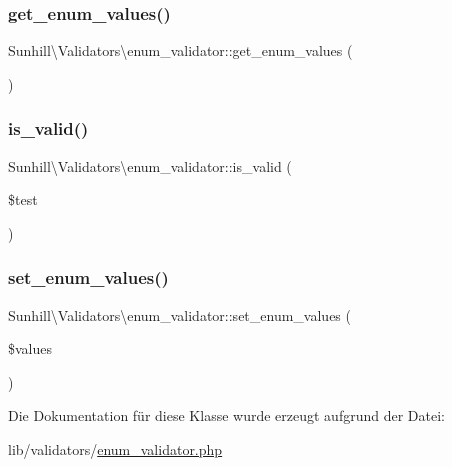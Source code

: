 \subsubsection{\texorpdfstring{get\+\_\+enum\+\_\+values()}{get\_enum\_values()}}
{\footnotesize\ttfamily Sunhill\textbackslash{}\+Validators\textbackslash{}enum\+\_\+validator\+::get\+\_\+enum\+\_\+values (\begin{DoxyParamCaption}{ }\end{DoxyParamCaption})}

\mbox{\label{classSunhill_1_1Validators_1_1enum__validator_ac00328723663a42eea318e463e986aa0}} 
\subsubsection{\texorpdfstring{is\+\_\+valid()}{is\_valid()}}
{\footnotesize\ttfamily Sunhill\textbackslash{}\+Validators\textbackslash{}enum\+\_\+validator\+::is\+\_\+valid (\begin{DoxyParamCaption}\item[{}]{\$test }\end{DoxyParamCaption})\hspace{0.3cm}{\ttfamily [protected]}}

\mbox{\label{classSunhill_1_1Validators_1_1enum__validator_af3a3be22740fa74c2fe063cf1fafe467}} 
\subsubsection{\texorpdfstring{set\+\_\+enum\+\_\+values()}{set\_enum\_values()}}
{\footnotesize\ttfamily Sunhill\textbackslash{}\+Validators\textbackslash{}enum\+\_\+validator\+::set\+\_\+enum\+\_\+values (\begin{DoxyParamCaption}\item[{}]{\$values }\end{DoxyParamCaption})}



Die Dokumentation für diese Klasse wurde erzeugt aufgrund der Datei\+:\begin{DoxyCompactItemize}
\item 
lib/validators/\hyperlink{enum__validator_8php}{enum\+\_\+validator.\+php}\end{DoxyCompactItemize}
